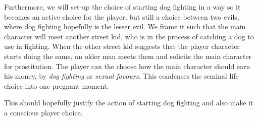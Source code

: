 Furthermore, we will set-up the choice of starting dog fighting in a way so it becomes an active choice for the player, but still a choice between two evils, where dog fighting hopefully is the lesser evil. We frame it such that the main character will meet another street kid, who is in the process of catching a dog to use in fighting. When the other street kid suggests that the player character starts doing the same, an older man meets them and solicits the main character for prostitution. The player can the choose how the main character should earn his money, by \textit{dog fighting} or \textit{sexual favours}. This condenses the seminal life choice into one pregnant moment.\

This should hopefully justify the action of starting dog fighting and also make it a conscious player choice.\
